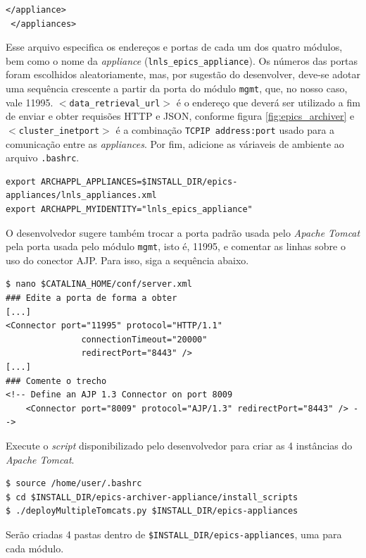 \begin {enumerate}[i.]
\begin{lstlisting}[keywordstyle=\ttfamily, style=nonumbers]
   </appliance>
 </appliances>
\end{lstlisting} 
Esse arquivo especifica os endereços e portas de cada um dos quatro módulos, bem
como o nome da \textit{appliance} (\texttt{lnls\_epics\_appliance}). Os números
das portas foram escolhidos aleatoriamente, mas, por sugestão do desenvolver,
deve-se adotar uma sequência crescente a partir da porta do módulo
\texttt{mgmt}, que, no nosso caso, vale 11995.
\texttt{\(<\)data\_retrieval\_url\(>\)} é o endereço que deverá ser utilizado
a fim de enviar e obter requisões HTTP e JSON, conforme figura
\ref{fig:epics_archiver} e \texttt{\(<\)cluster\_inetport\(>\)} é a combinação
\texttt{TCPIP address:port} usado para a comunicação entre as
\textit{appliances}. Por fim, adicione as váriaveis de ambiente ao arquivo
\texttt{.bashrc}.

\begin{lstlisting}[keywordstyle=\ttfamily, style=nonumbers]
export ARCHAPPL_APPLIANCES=$INSTALL_DIR/epics-appliances/lnls_appliances.xml
export ARCHAPPL_MYIDENTITY="lnls_epics_appliance"
\end{lstlisting}


O desenvolvedor sugere também trocar a porta padrão usada pelo \textit{Apache
Tomcat} pela porta usada pelo módulo \texttt{mgmt}, isto é, 11995, e comentar
as linhas sobre o uso do conector AJP. Para isso, siga a sequência abaixo.

\begin{lstlisting}[keywordstyle=\ttfamily, style=nonumbers]
$ nano $CATALINA_HOME/conf/server.xml
### Edite a porta de forma a obter
[...]
<Connector port="11995" protocol="HTTP/1.1"
               connectionTimeout="20000"
               redirectPort="8443" />
[...]
### Comente o trecho
<!-- Define an AJP 1.3 Connector on port 8009 
    <Connector port="8009" protocol="AJP/1.3" redirectPort="8443" /> -->
\end{lstlisting}

Execute o \textit{script} disponibilizado pelo desenvolvedor para criar as 4
instâncias do \textit{Apache Tomcat}.

\begin{lstlisting}[keywordstyle=\ttfamily, style=nonumbers]
$ source /home/user/.bashrc
$ cd $INSTALL_DIR/epics-archiver-appliance/install_scripts
$ ./deployMultipleTomcats.py $INSTALL_DIR/epics-appliances
\end{lstlisting}

Serão criadas 4 pastas dentro de \texttt{\$INSTALL\_DIR/epics-appliances}, uma
para cada módulo.


\end{enumerate}
